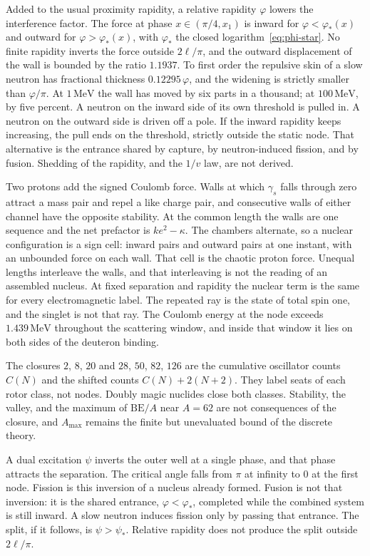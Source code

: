 \documentclass[a4paper]{article}
\begin{document}
Added to the usual proximity rapidity, a relative rapidity \(\varphi\) lowers the interference factor. The force at phase \(x\in(\pi/4,x_1)\) is inward for \(\varphi<\varphi_*(x)\) and outward for \(\varphi>\varphi_*(x)\), with \(\varphi_*\) the closed logarithm~\eqref{eq:phi-star}. No finite rapidity inverts the force outside \(2\ell/\pi\), and the outward displacement of the wall is bounded by the ratio \(1.1937\). To first order the repulsive skin of a slow neutron has fractional thickness \(0.12295\,\varphi\), and the widening is strictly smaller than \(\varphi/\pi\). At \(1\,\mathrm{MeV}\) the wall has moved by six parts in a thousand; at \(100\,\mathrm{MeV}\), by five percent. A neutron on the inward side of its own threshold is pulled in. A neutron on the outward side is driven off a pole. If the inward rapidity keeps increasing, the pull ends on the threshold, strictly outside the static node. That alternative is the entrance shared by capture, by neutron-induced fission, and by fusion. Shedding of the rapidity, and the \(1/v\) law, are not derived.

Two protons add the signed Coulomb force. Walls at which \(\gamma_s\) falls through zero attract a mass pair and repel a like charge pair, and consecutive walls of either channel have the opposite stability. At the common length the walls are one sequence and the net prefactor is \(ke^{2}-\kappa\). The chambers alternate, so a nuclear configuration is a sign cell: inward pairs and outward pairs at one instant, with an unbounded force on each wall. That cell is the chaotic proton force. Unequal lengths interleave the walls, and that interleaving is not the reading of an assembled nucleus. At fixed separation and rapidity the nuclear term is the same for every electromagnetic label. The repeated ray is the state of total spin one, and the singlet is not that ray. The Coulomb energy at the node exceeds \(1.439\,\mathrm{MeV}\) throughout the scattering window, and inside that window it lies on both sides of the deuteron binding.

The closures \(2\), \(8\), \(20\) and \(28\), \(50\), \(82\), \(126\) are the cumulative oscillator counts \(C(N)\) and the shifted counts \(C(N)+2(N+2)\). They label seats of each rotor class, not nodes. Doubly magic nuclides close both classes. Stability, the valley, and the maximum of \(\mathrm{BE}/A\) near \(A=62\) are not consequences of the closure, and \(A_{\max}\) remains the finite but unevaluated bound of the discrete theory.

A dual excitation \(\psi\) inverts the outer well at a single phase, and that phase attracts the separation. The critical angle falls from \(\pi\) at infinity to \(0\) at the first node. Fission is this inversion of a nucleus already formed. Fusion is not that inversion: it is the shared entrance, \(\varphi<\varphi_*\), completed while the combined system is still inward. A slow neutron induces fission only by passing that entrance. The split, if it follows, is \(\psi>\psi_*\). Relative rapidity does not produce the split outside \(2\ell/\pi\).
\end{document}

